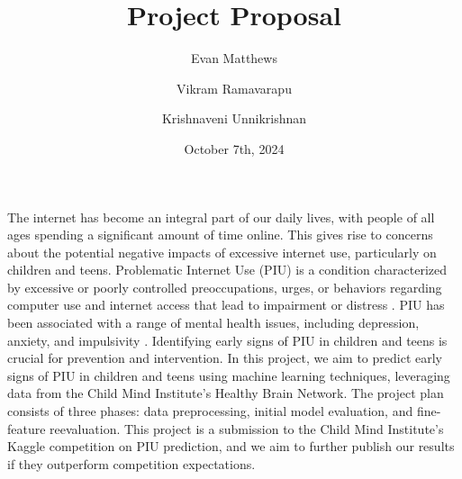 \documentclass[12pt]{extarticle}
\title{Project Proposal}
\author[1]{Evan Matthews}
\author[1]{Vikram Ramavarapu}
\author[1]{Krishnaveni Unnikrishnan}
\affil[1]{CS 412 Group 6}
\date{October 7th, 2024}
\begin{document}
\maketitle

\pagebreak





The internet has become an integral part of our daily lives, with people of all ages spending a significant amount of time online. This gives rise to concerns about the potential negative impacts of excessive internet use, particularly on children and teens.
Problematic Internet Use (PIU) is a condition characterized by excessive or poorly controlled preoccupations, urges, or behaviors regarding computer use and internet access that lead to impairment or distress \cite{Pettorruso2020-qt}. 
PIU has been associated with a range of mental health issues, including depression, anxiety, and impulsivity \cite{Cash2012-rb}.
Identifying early signs of PIU in children and teens is crucial for prevention and intervention.
In this project, we aim to predict early signs of PIU in children and teens using machine learning techniques, leveraging data from the Child Mind Institute's Healthy Brain Network.
The project plan consists of three phases: data preprocessing, initial model evaluation, and fine-feature reevaluation.
This project is a submission to the Child Mind Institute's Kaggle competition on PIU prediction, and we aim to further publish our results if they outperform competition expectations.

\end{document}
